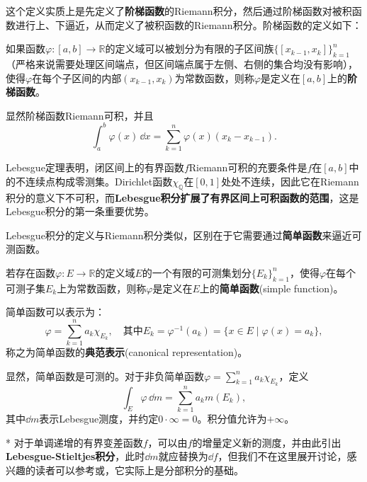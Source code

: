 这个定义实质上是先定义了\textbf{阶梯函数}的Riemann积分，然后通过阶梯函数对被积函数进行上、下逼近，从而定义了被积函数的Riemann积分。阶梯函数的定义如下：

\begin{definition}[阶梯函数]
    如果函数$\varphi:[a,b]\to\mathbb{R}$的定义域可以被划分为有限的子区间族$\{[x_{k-1},x_k]\}_{k=1}^{n}$（严格来说需要处理区间端点，但区间端点属于左侧、右侧的集合均没有影响），使得$\varphi$在每个子区间的内部$(x_{k-1},x_k)$为常数函数，则称$\varphi$是定义在$[a,b]$上的\textbf{阶梯函数}。

    显然阶梯函数Riemann可积，并且
    \begin{equation}
        \int_{a}^{b}\varphi(x)\,\dd x=\sum_{k=1}^{n}\varphi(x)(x_k-x_{k-1}).
    \end{equation}
\end{definition}

Lebesgue定理\cite{real_analysis}表明，闭区间上的有界函数$f$Riemann可积的充要条件是$f$在$[a,b]$中的不连续点构成零测集。Dirichlet函数$\chi_{\mathbb{Q}}$在$[0,1]$处处不连续，因此它在Riemann积分的意义下不可积，而\textbf{Lebesgue积分扩展了有界区间上可积函数的范围}，这是Lebesgue积分的第一条重要优势。

Lebesgue积分的定义与Riemann积分类似，区别在于它需要通过\textbf{简单函数}来逼近可测函数。

\begin{definition}[简单函数]
    若存在函数$\varphi:E\to\mathbb{R}$的定义域$E$的一个有限的可测集划分$\{E_k\}_{k=1}^{n}$，使得$\varphi$在每个可测子集$E_k$上为常数函数，则称$\varphi$是定义在$E$上的\textbf{简单函数}(simple function)。

    简单函数可以表示为：
    \begin{equation}
        \varphi=\sum_{k=1}^{n}a_k\chi_{E_k},\quad \text{其中}E_k=\varphi^{-1}(a_k)=\{x\in E \mid \varphi(x)=a_k\},
    \end{equation}
    称之为简单函数的\textbf{典范表示}(canonical representation)。
\end{definition}

显然，简单函数是可测的。对于非负简单函数$\varphi=\sum_{k=1}^{n}a_k\chi_{E_k}$，定义
\begin{equation}
    \int_{E}\varphi\,\dd m=\sum_{k=1}^{n}a_k m(E_k),
\end{equation}
其中$\dd m$表示Lebesgue测度，并约定$0\cdot\infty=0$。积分值允许为$+\infty$。
\begin{remark}*
    对于单调递增的有界变差函数$f$，可以由$f$的增量定义新的测度，并由此引出\textbf{Lebesgue-Stieltjes积分}，此时$\dd m$就应替换为$\dd f$，但我们不在这里展开讨论，感兴趣的读者可以参考\cite{simple_real_analysis}或\cite{chentianquan}，它实际上是分部积分的基础。
\end{remark}

